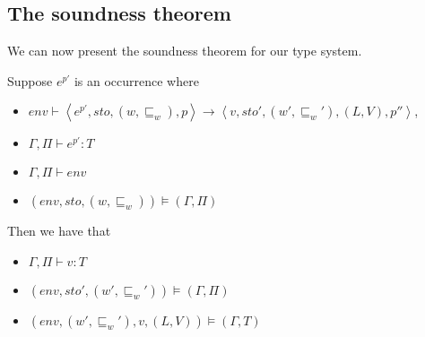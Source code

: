 \documentclass{llncs}
\newcommand{\sqleq}{\ensuremath{\sqsubseteq\xspace}}
\begin{document}




\subsection{The soundness theorem}

We can now present the soundness theorem for our type system.

\begin{theorem}[Soundness]
	Suppose $e^{p'}$ is an occurrence where
	\begin{itemize}
		\item $env\vdash\left\langle e^{p'},sto,(w,\sqleq_w),p\right\rangle\rightarrow\left\langle v,sto',(w',\sqleq_w'),(L,V),p''\right\rangle$,
		\item $\Gamma,\Pi\vdash e^{p'} : T$
		\item $\Gamma,\Pi\vdash env$
		\item $(env,sto,(w,\sqleq_w))\models(\Gamma,\Pi)$
	\end{itemize}
	Then we have that
	\begin{itemize}
		\item $\Gamma,\Pi\vdash v:T$
		\item $(env,sto',(w',\sqleq_w'))\models(\Gamma,\Pi)$
		\item $(env,(w',\sqleq_w'),v,(L,V))\models(\Gamma,T)$
	\end{itemize}
\end{theorem}
\end{document}
